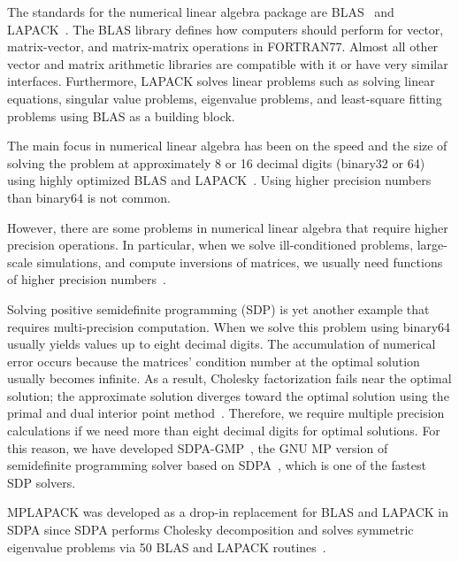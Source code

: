 \documentclass[12pt]{article}
\begin{document}
The standards for the numerical linear algebra package are BLAS~\cite{10.1145/567806.567807} and LAPACK~\cite{laug}. The BLAS library defines how computers should perform for vector, matrix-vector, and matrix-matrix operations in FORTRAN77. Almost all other vector and matrix arithmetic libraries are compatible with it or have very similar interfaces. Furthermore, LAPACK solves linear problems such as solving linear equations, singular value problems, eigenvalue problems, and least-square fitting problems using BLAS as a building block.

The main focus in numerical linear algebra has been on the speed and the size of solving the problem at approximately 8 or 16 decimal digits (binary32 or 64) using highly optimized BLAS and LAPACK~\cite{4610935,10.1145/1356052.1356053,6413635,8519659,cublas,tdb10}. Using higher precision numbers than binary64 is not common.

However, there are some problems in numerical linear algebra that require higher precision operations. In particular, when we solve ill-conditioned problems, large-scale simulations, and compute inversions of matrices, we usually need functions of higher precision numbers~\cite{BAILEY201210106,math3020337,high:ASNA2}.

Solving positive semidefinite programming (SDP) is yet another example that requires multi-precision computation. When we solve this problem using binary64 usually yields values up to eight decimal digits. The accumulation of numerical error occurs because the matrices' condition number at the optimal solution usually becomes infinite. As a result, Cholesky factorization fails near the optimal solution; the approximate solution diverges toward the optimal solution using the primal and dual interior point method~\cite{SDP}. Therefore, we require multiple precision calculations if we need more than eight decimal digits for optimal solutions. For this reason, we have developed SDPA-GMP~\cite{JCP2008,SDPA-GMP,SDPA}, the GNU MP version of semidefinite programming solver based on SDPA~\cite{SDPA}, which is one of the fastest SDP solvers.

MPLAPACK was developed as a drop-in replacement for BLAS and LAPACK in SDPA since SDPA performs Cholesky decomposition and solves symmetric eigenvalue problems via 50 BLAS and LAPACK routines~\cite{sdpa-gmpgithub}.
\end{document}

